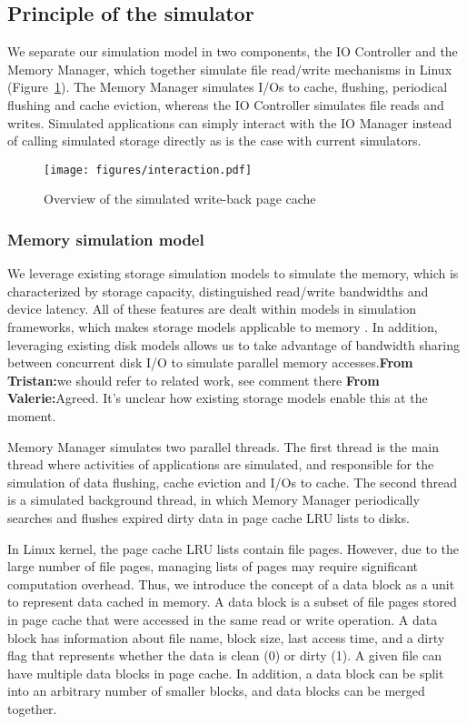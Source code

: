 \documentclass[conference]{IEEEtran}
\newcommand{\tristan}[1]{\color{orange}\textbf{From Tristan:}#1\color{black}}
\newcommand{\valerie}[1]{\color{blue}\textbf{From Valerie:}#1\color{black}}
\begin{document}
		\subsection{Principle of the simulator}
	
            We separate our simulation model in two components, the IO
			Controller and the Memory Manager, which together simulate 
			file read/write mechanisms in Linux (Figure~\ref{fig:interaction}). 
			The Memory Manager simulates I/Os to cache, flushing, periodical flushing 
			and cache eviction, whereas the IO Controller simulates file reads and writes. 
			Simulated applications can simply interact with the IO Manager instead of 
			calling simulated storage directly as is the case with current simulators.

			\begin{figure}
   				\centering
   				\texttt{[image: figures/interaction.pdf]}
   				\caption{Overview of the simulated write-back page cache}\label{fig:interaction}
			\end{figure}	

			\subsubsection{Memory simulation model}
			
			We leverage existing storage simulation models to simulate the memory,
			which is characterized by storage capacity, distinguished read/write 
			bandwidths and device latency. 
			All of these features are dealt within models in simulation 
			frameworks, which makes storage models applicable to memory \cite{lebre2015}. 
			In addition, leveraging existing disk models allows us 
			to take advantage of bandwidth sharing between concurrent disk I/O to 
			simulate parallel memory accesses.\tristan{we should refer to related work, 
            see comment there} \valerie{Agreed. It's unclear how existing storage models enable this at the moment}.

			Memory Manager simulates two parallel threads. The first thread is the 
			main thread where activities of applications are simulated, and responsible 
			for the simulation of data flushing, cache eviction and I/Os to cache. 
			The second thread is a simulated background thread, in which Memory Manager 
			periodically searches and flushes expired dirty data in page cache LRU lists 
			to disks. 

			In Linux kernel, the page cache LRU lists contain file pages. However, 
			due to the large number of file pages, managing lists of pages may 
			require significant computation overhead. 
			Thus, we introduce the concept of a data block as a unit to represent data 
			cached in memory. A data block is a subset of file pages stored in
            page cache that were accessed in the same read or write operation. 
			A data block has information about file name, block size, last access 
			time, and a dirty flag that represents whether the data is clean (0) 
			or dirty (1). 
			A given file can have multiple data blocks in page cache. In
			addition, a data block can be split into an arbitrary number of
			smaller blocks, and data blocks can be merged together.
\end{document}

